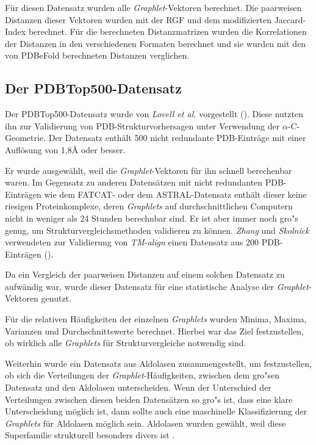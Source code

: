 \documentclass{report}
\begin{document}
F\"ur diesen Datensatz wurden alle \textit{Graphlet}-Vektoren berechnet. Die paarweisen Distanzen dieser Vektoren wurden mit der RGF und dem modifizierten Jaccard-Index berechnet. F\"ur die berechneten Distanzmatrizen wurden die Korrelationen der Distanzen in den verschiedenen Formaten berechnet und sie wurden mit den von PDBeFold berechneten Distanzen verglichen. 



\subsection{Der PDBTop500-Datensatz}

Der PDBTop500-Datensatz wurde von \textit{Lovell et al.} vorgestellt (\cite{top500}). Diese nutzten ihn zur Validierung von PDB-Strukturvorhersagen unter Verwendung der $\alpha$-C-Geometrie.
Der Datensatz enth\"alt 500 nicht redundante PDB-Eintr\"age mit einer Aufl\"osung von 1,8\AA{}  oder besser.

Er wurde ausgew\"ahlt, weil die \textit{Graphlet}-Vektoren f\"ur ihn schnell berechenbar waren. Im Gegensatz zu anderen Datens\"atzen mit nicht redundanten PDB-Eintr\"agen wie dem FATCAT- oder dem ASTRAL-Datensatz enth\"alt dieser keine riesigen Proteinkomplexe, deren \textit{Graphlets} auf durchschnittlichen Computern nicht in weniger als 24 Stunden berechnbar sind. 
Er ist aber immer noch gro"s genug, um Strukturvergleichsmethoden validieren zu k\"onnen. \textit{Zhang} und \textit{Skolnick} verwendeten zur Validierung von \textit{TM-align} einen Datensatz aus 200 PDB-Eintr\"agen (\cite{zhangtm}).

Da ein Vergleich der paarweisen Distanzen auf einem solchen Datensatz zu aufw\"andig war, wurde dieser Datensatz f\"ur eine statistische Analyse der \textit{Graphlet}-Vektoren genutzt.

F\"ur die relativen H\"aufigkeiten der einzelnen \textit{Graphlets} wurden Minima, Maxima, Varianzen und Durchschnittswerte berechnet. Hierbei war das Ziel festzustellen, ob wirklich alle \textit{Graphlets} f\"ur Strukturvergleiche notwendig sind.

Weiterhin wurde ein Datensatz aus Aldolasen zusammengestellt, um festzustellen, ob sich die Verteilungen der \textit{Graphlet}-H\"aufigkeiten, zwischen dem gro"sen Datensatz und den Aldolasen unterscheiden. Wenn der Unterschied der Verteilungen zwischen diesen beiden Datens\"atzen so gro"s ist, dass eine klare Unterscheidung m\"oglich ist, dann sollte auch eine maschinelle Klassifizierung der \textit{Graphlets} f\"ur Aldolasen m\"oglich sein. Aldolasen wurden gew\"ahlt, weil diese Superfamilie strukturell besonders divers ist \cite{das2015diversity}.
\end{document}
